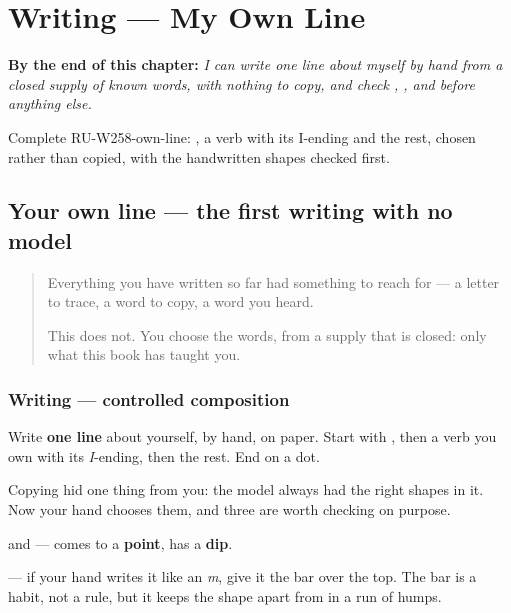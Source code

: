 
\chapter{Writing --- My Own Line}
\label{ch:ru-own-line}

\begin{chapteropening}
\textbf{By the end of this chapter:} \emph{I can write one line about myself by hand from a closed supply of known words, with nothing to copy, and check , ,  and  before anything else.}

Complete RU-W258-own-line: , a verb with its I-ending and the rest, chosen rather than copied, with the handwritten shapes checked first.
\end{chapteropening}

\section[(my own line)]{Your own line — the first writing with no model}

\label{lesson:RU-W258-own-line}



\begin{quote}
Everything you have written so far had something to reach for — a letter to trace, a word to copy, a word you heard.

This does not. You choose the words, from a supply that is closed: only what this book has taught you.
\end{quote}

\subsection*{Writing — controlled composition}
Write \textbf{one line} about yourself, by hand, on paper. Start with \textbf{}, then a verb you own with its \emph{I}-ending, then the rest. End on a dot.

Copying hid one thing from you: the model always had the right shapes in it. Now your hand chooses them, and three are worth checking on purpose.

\textbf{} and \textbf{} — \textbf{} comes to a \textbf{point}, \textbf{} has a \textbf{dip}.

\textbf{} — if your hand writes it like an \emph{m}, give it the bar over the top. The bar is a habit, not a rule, but it keeps the shape apart from \textbf{} in a run of humps.

